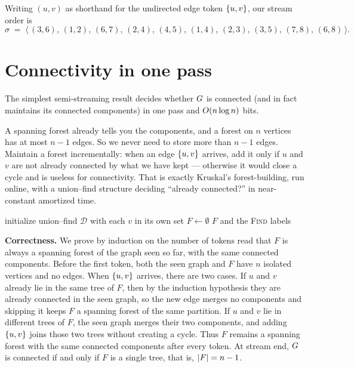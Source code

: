 Writing $(u,v)$ as shorthand for the undirected edge token $\{u,v\}$, our
stream order is
\[
\sigma \;=\; \langle\,(3,6),\,(1,2),\,(6,7),\,(2,4),\,(4,5),\,(1,4),\,(2,3),\,(3,5),\,(7,8),\,(6,8)\,\rangle.
\]

\section{Connectivity in one pass}
\label{ch40:connectivity}

The simplest semi-streaming result decides whether $G$ is connected (and
in fact maintains its connected components) in one pass and $O(n\log n)$
bits.

\begin{intuitionbox}
A spanning forest already tells you the components, and a forest on $n$
vertices has at most $n-1$ edges. So we never need to store more than $n-1$
edges. Maintain a forest incrementally: when an edge $\{u,v\}$ arrives, add
it only if $u$ and $v$ are not already connected by what we have kept ---
otherwise it would close a cycle and is useless for connectivity. That is
exactly Kruskal's forest-building, run online, with a union--find structure
deciding ``already connected?'' in near-constant amortized time.
\end{intuitionbox}

\begin{algorithm}[H]
\caption{\textsc{StreamingSpanningForest}}
\label{ch40:alg-forest}
\DontPrintSemicolon
{}
initialize union--find $\mathcal{D}$ with each $v$ in its own set\;
$F \gets \emptyset$\;
\Return $F$ and the \textsc{Find} labels\;
\end{algorithm}

\begin{whybox}
\textbf{Correctness.} We prove by induction on the number of tokens read that
$F$ is always a spanning forest of the graph seen so far, with the same
connected components. Before the first token, both the seen graph and $F$ have
$n$ isolated vertices and no edges. When $\{u,v\}$ arrives, there are two
cases. If $u$ and $v$ already lie in the same tree of $F$, then by the
induction hypothesis they are already connected in the seen graph, so the new
edge merges no components and skipping it keeps $F$ a spanning forest of the
same partition. If $u$ and $v$ lie in different trees of $F$, the seen graph
merges their two components, and adding $\{u,v\}$ joins those two trees
without creating a cycle. Thus $F$ remains a spanning forest with the same
connected components after every token. At stream end, $G$ is connected if
and only if $F$ is a single tree, that is, $\lvert F\rvert=n-1$.
\end{whybox}

